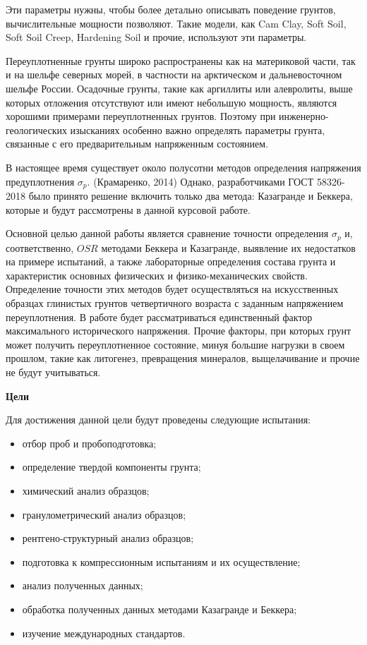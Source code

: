 Эти параметры нужны, чтобы более детально описывать поведение грунтов, вычислительные мощности позволяют. 
Такие модели, как Cam Clay, Soft Soil, Soft Soil Creep, Hardening Soil и прочие, используют эти параметры. 

Переуплотненные грунты широко распространены как на материковой части, так и на шельфе северных морей, в частности на арктическом и дальневосточном шельфе России.
Осадочные грунты, такие как аргиллиты или алевролиты, выше которых отложения отсутствуют или имеют небольшую мощность, являются хорошими примерами переуплотненных грунтов.
Поэтому при инженерно-геологических изысканиях особенно важно определять параметры грунта, связанные с его предварительным напряженным состоянием.

В настоящее время существует около полусотни  методов определения напряжения предуплотнения $\sigma_p$. (Крамаренко, 2014) \cite{kram2014}
Однако, разработчиками ГОСТ 58326-2018 было принято решение включить только два метода: Казагранде и Беккера, которые и будут рассмотрены в данной курсовой работе. 

Основной целью данной работы является сравнение точности определения $\sigma_p$ и, соответственно, $OSR$ методами Беккера и Казагранде, выявление их недостатков на примере испытаний, а также лабораторные определения состава грунта и характеристик основных физических и физико-механических свойств. 
Определение точности этих методов будет осуществляться на искусственных образцах глинистых грунтов четвертичного возраста с заданным напряжением переуплотнения. 
В работе будет рассматриваться единственный фактор максимального исторического напряжения. Прочие факторы, при которых грунт может получить переуплотненное состояние, минуя большие нагрузки в своем прошлом, такие как литогенез, превращения минералов, выщелачивание и прочие не будут учитываться.

\textbf{Цели}

Для достижения данной цели будут проведены следующие испытания:
\begin{itemize}
    \item отбор проб и пробоподготовка; 
    \item определение твердой компоненты грунта;
    \item химический анализ образцов;
    \item гранулометрический анализ образцов;
    \item рентгено-структурный анализ образцов;
    \item подготовка к компрессионным испытаниям и их осуществление;
    \item анализ полученных данных;
    \item обработка полученных данных методами Казагранде и Беккера;
    \item изучение международных стандартов.
\end{itemize}

